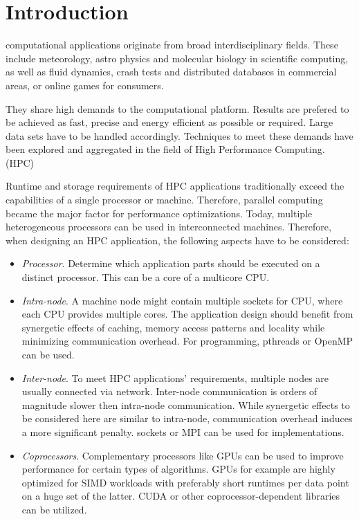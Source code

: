\section{Introduction}

 computational applications originate from broad interdisciplinary fields. These include meteorology, astro physics and molecular biology in scientific computing, as well as fluid dynamics, crash tests and distributed databases in commercial areas, or online games for consumers.

They share high demands to the computational platform. Results are prefered to be achieved as fast, precise and energy efficient as possible or required. Large data sets have to be handled accordingly. Techniques to meet these demands have been explored and aggregated in the field of High Performance Computing. (HPC)

Runtime and storage requirements of HPC applications traditionally exceed the capabilities of a single processor or machine. Therefore, parallel computing became the major factor for performance optimizations. Today, multiple heterogeneous processors can be used in interconnected machines. Therefore, when designing an HPC application, the following aspects have to be considered:

\begin{itemize}

\item \textit{Processor}. Determine which application parts should be executed on a distinct processor. This can be a core of a multicore CPU.

\item \textit{Intra-node}. A machine node might contain multiple sockets for CPU, where each CPU provides multiple cores. The application design should benefit from synergetic effects of caching, memory access patterns and locality while minimizing communication overhead. For programming, pthreads or OpenMP can be used.

\item \textit{Inter-node}. To meet HPC applications' requirements, multiple nodes are usually connected via network. Inter-node communication is orders of magnitude slower then intra-node communication. While synergetic effects to be considered here are similar to intra-node, communication overhead induces a more significant penalty. sockets or MPI can be used for implementations.

\item \textit{Coprocessors}. Complementary processors like GPUs can be used to improve performance for certain types of algorithms. GPUs for example are highly optimized for SIMD workloads with preferably short runtimes per data point on a huge set of the latter. CUDA or other coprocessor-dependent libraries can be utilized.

\end{itemize}


